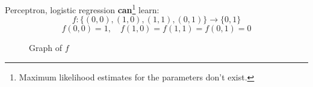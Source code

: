 \documentclass{beamer}
\begin{document}
\begin{frame}{}
    Perceptron, logistic regression \textbf{can}\footnote{Maximum likelihood estimates for the parameters don't exist.} learn:
    \[
        f:\big\{(0, 0), (1, 0), (1, 1), (0, 1)\big\}\longrightarrow
        \{0,1\}
    \]
    \[
        f(0, 0) =  1,\quad f(1, 0) = f(1, 1) = f(0, 1) = 0
    \]

    \begin{figure}
        \caption{Graph of $f$}
    \end{figure}
\end{frame}
\end{document}
